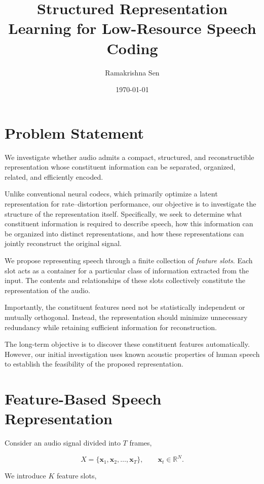 \documentclass{article}
\title{Structured Representation Learning for Low-Resource Speech Coding}
\author{Ramakrishna Sen}
\date{\today}
\begin{document}
\maketitle

\section{Problem Statement}

We investigate whether audio admits a compact, structured,
and reconstructible representation whose constituent information
can be separated, organized, related, and efficiently encoded.

Unlike conventional neural codecs, which primarily optimize a
latent representation for rate--distortion performance, our
objective is to investigate the structure of the representation
itself. Specifically, we seek to determine what constituent
information is required to describe speech, how this information
can be organized into distinct representations, and how these
representations can jointly reconstruct the original signal.

We propose representing speech through a finite collection of
\emph{feature slots}. Each slot acts as a container for a
particular class of information extracted from the input.
The contents and relationships of these slots collectively
constitute the representation of the audio.

Importantly, the constituent features need not be statistically
independent or mutually orthogonal. Instead, the representation
should minimize unnecessary redundancy while retaining
sufficient information for reconstruction.

The long-term objective is to discover these constituent
features automatically. However, our initial investigation
uses known acoustic properties of human speech to establish
the feasibility of the proposed representation.

\section{Feature-Based Speech Representation}

Consider an audio signal divided into $T$ frames,

\begin{equation}
    X = \{\mathbf{x}_1,\mathbf{x}_2,\ldots,\mathbf{x}_T\},
    \qquad \mathbf{x}_t\in\mathbb{R}^{N}.
\end{equation}

We introduce $K$ feature slots,
\end{document}
